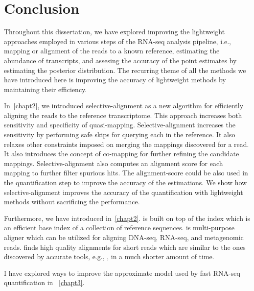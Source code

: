 
\renewcommand{\thechapter}{5}

\chapter[Conclusion]{Conclusion} 
\label{conclusion}

Throughout this dissertation, we have explored improving the lightweight approaches
employed in various steps of the RNA-seq analysis pipeline, i.e., mapping or alignment
of the reads to a known reference, estimating the abundance of transcripts, and 
assesing the accuracy of the point estimates by estimating the posterior distribution.
The recurring theme of all the methods we have introduced here is improving the accuracy
of lightweight methods by maintaining their efficiency.

In~\cref{chapt2}, we introduced selective-alignment as a new algorithm for efficiently
aligning the reads to the reference transcriptome. This approach increases both sensitivity
and specificity of quasi-mapping. Selective-alignment increases the sensitivity by performing
safe skips for querying each \kmer in the reference. It also relaxes other constraints
imposed on merging the mappings discovered for a read. It also introduces the concept of 
co-mapping for further refining the candidate mappings. Selective-alignment also computes
an alignment score for each mapping to further filter spurious hits. The alignment-score
could be also used in the quantification step to improve the accuracy of the estimations.
We show how selective-alignment improves the accuracy of the quantification with lightweight
methods without sacrificing the performance.

Furthermore, we have introduced \puffaligner in~\cref{chapt2}. \puffaligner is built on top
of the \pufferfish index which is an efficient \ccdbg base index of a collection of reference
sequences. \puffaligner is multi-purpose aligner which can be utilized for aligning DNA-seq, 
RNA-seq, and metagenomic reads. \puffaligner finds high quality alignments for short reads 
which are similar to the ones discovered by accurate tools, e.g., \bt, in a much shorter amount
of time.

I have explored ways to improve the approximate model used by fast RNA-seq quantification in
~\cref{chapt3}.


